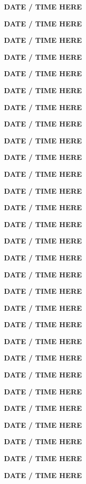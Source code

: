 \documentclass[12pt]{extbook}
\newcommand{\abstract}[2]{{
\begin{center}
\bfseries #1
\end{center}}
\par
}
\begin{document}
\clearpage

\abstract{DATE / TIME HERE}{abstracts/Slagter} %
\abstract{DATE / TIME HERE}{abstracts/Ortega}


\abstract{DATE / TIME HERE}{abstracts/Kipfer} %



\abstract{DATE / TIME HERE}{abstracts/Iwe}


\abstract{DATE / TIME HERE}{abstracts/Marion} %
\abstract{DATE / TIME HERE}{abstracts/Wang}
\abstract{DATE / TIME HERE}{abstracts/Blanc}
\abstract{DATE / TIME HERE}{abstracts/Brennwald}
\abstract{DATE / TIME HERE}{abstracts/Currle} %


\abstract{DATE / TIME HERE}{abstracts/GroegerTrampe}
\abstract{DATE / TIME HERE}{abstracts/vanRooyen} %
\abstract{DATE / TIME HERE}{abstracts/Zhao} %
\abstract{DATE / TIME HERE}{abstracts/Musy} %


\abstract{DATE / TIME HERE}{abstracts/Engelhardt}
\abstract{DATE / TIME HERE}{abstracts/Picard}
\abstract{DATE / TIME HERE}{abstracts/Hillegonds}

\abstract{DATE / TIME HERE}{abstracts/Dutoit} %
\abstract{DATE / TIME HERE}{abstracts/Kim} %
\abstract{DATE / TIME HERE}{abstracts/Giroud}
\abstract{DATE / TIME HERE}{abstracts/Lightfoot}
\abstract{DATE / TIME HERE}{abstracts/Roques}

\abstract{DATE / TIME HERE}{abstracts/Strauch_Zimmer} 

\abstract{DATE / TIME HERE}{abstracts/Daskalopoulou} %
\abstract{DATE / TIME HERE}{abstracts/Tomonaga}


\abstract{DATE / TIME HERE}{abstracts/Kimani}
\abstract{DATE / TIME HERE}{abstracts/Mtili}

\abstract{DATE / TIME HERE}{abstracts/Finger} %


\abstract{DATE / TIME HERE}{abstracts/Jacops} %
\abstract{DATE / TIME HERE}{abstracts/vanLeeuw} %




\end{document}
